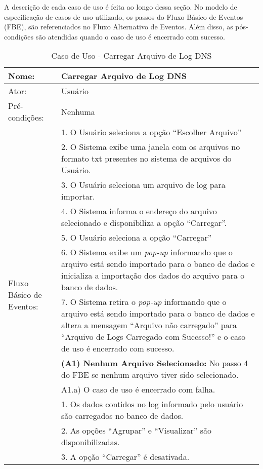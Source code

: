 A descrição de cada caso de uso é feita ao longo dessa seção. No modelo de especificação de casos de uso utilizado, os passos do Fluxo Básico de Eventos (FBE), são referenciados no Fluxo Alternativo de Eventos. Além disso, as pós-condições são atendidas quando o caso de uso é encerrado com sucesso.

\begin{table}[]
\centering
\caption{Caso de Uso - Carregar Arquivo de Log DNS}
\label{tab:use_case_load_file}
\begin{tabular}{|lp{10cm}|}
\hline
Nome: & Carregar Arquivo de Log DNS  \\ \hline
Ator: & Usuário   \\ \hline
Pré-condições: & Nenhuma   \\ \hline
\multirow{15}{*}{Fluxo Básico de Eventos:} & 1. O Usuário seleciona a opção ``Escolher Arquivo''  \\
 & 2. O Sistema exibe uma janela com os arquivos no formato txt presentes no sistema de arquivos do Usuário.  \\
 & 3. O Usuário seleciona um arquivo de log para importar.  \\
 & 4. O Sistema informa o endereço do arquivo selecionado e disponibiliza a opção ``Carregar''. \\
 & 5. O Usuário seleciona a opção ``Carregar'' \\
 & 6. O Sistema exibe um \textit{pop-up} informando que o arquivo está sendo importado para o banco de dados e inicializa a importação dos dados do arquivo para o banco de dados. \\
 & 7. O Sistema retira o \textit{pop-up} informando que o arquivo está sendo importado para o banco de dados e altera a mensagem ``Arquivo não carregado'' para ``Arquivo de Logs Carregado com Sucesso!'' e o caso de uso é encerrado com sucesso.\\ \hline
\multirow{3}{*}{Fluxo Alternativo de Eventos:} & \textbf{(A1) Nenhum Arquivo Selecionado:} No passo 4 do FBE se nenhum arquivo tiver sido selecionado.\\
 & A1.a) O caso de uso é encerrado com falha.\\ \hline
\multirow{5}{*}{Pós-Condições:} & 1. Os dados contidos no log informado pelo usuário são carregados no banco de dados. \\
 & 2. As opções ``Agrupar'' e ``Visualizar'' são disponibilizadas.\\
 & 3. A opção ``Carregar'' é desativada.\\
\hline 
\end{tabular}
\end{table}

